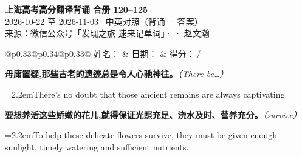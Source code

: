 \documentclass[11pt,a4paper]{article}
\newcommand{\num}[1]{\makebox[1.9em][r]{#1.}\hspace{0.3em}}
\newcommand{\prompt}[1]{\emph{\textcolor{tipblue}{\small（#1）}}}
\begin{document}
\pagestyle{plain}
\begin{center}
{\LARGE\bfseries 上海高考高分翻译背诵 \quad 合册 120–125}\\[0.25em]
{\large 2026-10-22 至 2026-11-03 \quad\ 中英对照（背诵 · 答案）}\\[0.35em]
{\footnotesize 来源：微信公众号「发现之旅 速来记单词」·  · 赵文瀚}
\end{center}

\vspace{0.4em}
\noindent\begin{tabular}{@{}p{0.33\textwidth}@{}p{0.34\textwidth}@{}p{0.33\textwidth}@{}}
姓名：\underline{\hspace{2.0cm}} & 日期：\underline{\hspace{2.0cm}} & 得分：\underline{\hspace{1.4cm}}\,/ \\
\end{tabular}

\vspace{0.5em}

\vspace{0.8em}
\vspace{0.35em}\vspace{0.15em}

\begin{minipage}{\linewidth}

\num{1}\textbf{毋庸置疑,那些古老的遗迹总是令人心驰神往。}\prompt{There be…}

\vspace{0.15em}

\noindent\hangindent=2.2em\hspace{2.2em}There’s no doubt that those ancient remains are always captivating.

\end{minipage}

\begin{minipage}{\linewidth}

\num{2}\textbf{要想养活这些娇嫩的花儿,就得保证光照充足、浇水及时、营养充分。}\prompt{survive}

\vspace{0.15em}

\noindent\hangindent=2.2em\hspace{2.2em}To help these delicate flowers survive, they must be given enough sunlight, timely watering and sufficient nutrients.

\end{minipage}
\end{document}
